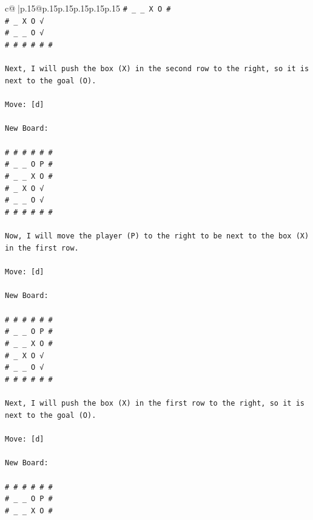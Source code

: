 \documentclass{article}
\begin{document}
{\begin{supertabular}{c@{$\;$}|p{.15\linewidth}@{}p{.15\linewidth}p{.15\linewidth}p{.15\linewidth}p{.15\linewidth}p{.15\linewidth}}
{{{\texttt{\# \_ \_ X O \#} \\
\texttt{\# \_ X O √} \\
\texttt{\# \_ \_ O √} \\
\texttt{\# \# \# \# \# \#} \\
\\ 
\texttt{Next, I will push the box (X) in the second row to the right, so it is next to the goal (O). } \\
\\ 
\texttt{Move: {[}d{]}} \\
\\ 
\texttt{New Board:} \\
\\ 
\texttt{\# \# \# \# \# \#} \\
\texttt{\# \_ \_ O P \#} \\
\texttt{\# \_ \_ X O \#} \\
\texttt{\# \_ X O √} \\
\texttt{\# \_ \_ O √} \\
\texttt{\# \# \# \# \# \#} \\
\\ 
\texttt{Now, I will move the player (P) to the right to be next to the box (X) in the first row. } \\
\\ 
\texttt{Move: {[}d{]}} \\
\\ 
\texttt{New Board:} \\
\\ 
\texttt{\# \# \# \# \# \#} \\
\texttt{\# \_ \_ O P \#} \\
\texttt{\# \_ \_ X O \#} \\
\texttt{\# \_ X O √} \\
\texttt{\# \_ \_ O √} \\
\texttt{\# \# \# \# \# \#} \\
\\ 
\texttt{Next, I will push the box (X) in the first row to the right, so it is next to the goal (O). } \\
\\ 
\texttt{Move: {[}d{]}} \\
\\ 
\texttt{New Board:} \\
\\ 
\texttt{\# \# \# \# \# \#} \\
\texttt{\# \_ \_ O P \#} \\
\texttt{\# \_ \_ X O \#} \\
}}}
\end{supertabular}}
\end{document}
